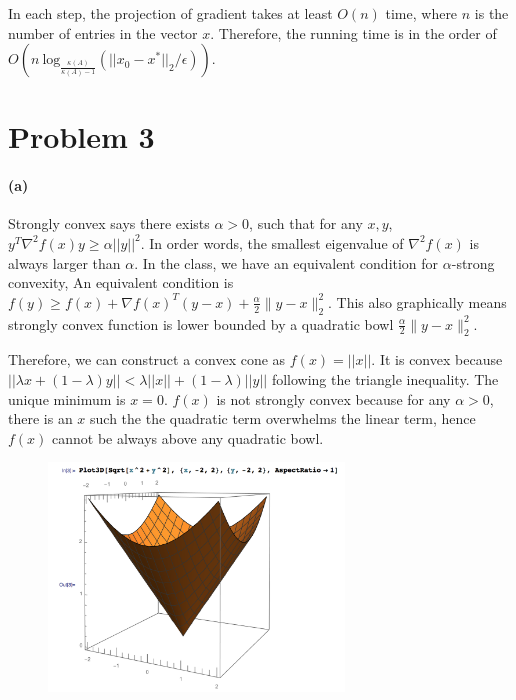 \documentclass[12pt]{article}
\begin{document}
In each step, the projection of gradient takes at least $O(n)$ time, where $n$ is the number of entries in the vector $x$. Therefore, the running time is in the order of $O\left(n \:\text{log}_{\frac{\kappa(A)}{\kappa(A) - 1}}(||x_0 - x^*||_2/\epsilon)\right)$. 

\newpage
\section*{Problem 3}
\paragraph{(a)} Strongly convex says there exists $\alpha >0$, such that for any $x, y$, $y^T \nabla^2 f(x) y \geq \alpha ||y||^2$. In order words, the smallest eigenvalue of $\nabla^2 f(x)$ is always larger than $\alpha$. In the class, we have an equivalent condition for $\alpha$-strong convexity, An equivalent condition is $f(y)\geq f(x)+\nabla f(x)^{T}(y-x)+{\frac {\alpha}{2}}\|y-x\|_{2}^{2}$. This also graphically means strongly convex function is lower bounded by a quadratic bowl $\frac{\alpha}{2}\|y-x\|_{2}^{2}$. 

Therefore, we can construct a convex cone as $f(x) = ||x||$. It is convex because $||\lambda x + (1-\lambda) y|| < \lambda ||x|| + (1-\lambda) ||y||$ following the triangle inequality. The unique minimum is $x=0$. $f(x)$ is not strongly convex because for any $\alpha >0$, there is an $x$ such the the quadratic term overwhelms the linear term, hence $f(x)$ cannot be always above any quadratic bowl.

\begin{figure}[h!]
	\centering
	\includegraphics[width=0.7\textwidth]{3-1.png}
	\label{fig:3-1}
\end{figure}
\end{document}
